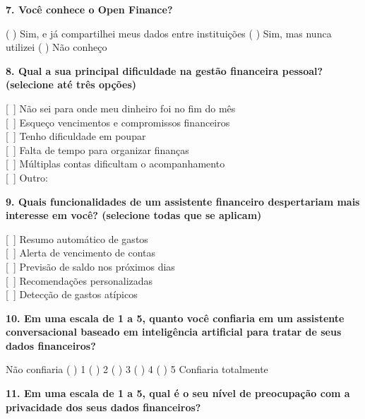 \textbf{7. Você conhece o Open Finance?}

\vspace{4pt}
( ) Sim, e já compartilhei meus dados entre instituições \quad ( ) Sim, mas nunca utilizei \quad ( ) Não conheço

\vspace{10pt}

\textbf{8. Qual a sua principal dificuldade na gestão financeira pessoal? (selecione até três opções)}

\vspace{4pt}
{[~]} Não sei para onde meu dinheiro foi no fim do mês\\
{[~]} Esqueço vencimentos e compromissos financeiros\\
{[~]} Tenho dificuldade em poupar\\
{[~]} Falta de tempo para organizar finanças\\
{[~]} Múltiplas contas dificultam o acompanhamento\\
{[~]} Outro: \underline{\hspace{5cm}}

\vspace{10pt}

\textbf{9. Quais funcionalidades de um assistente financeiro despertariam mais interesse em você? (selecione todas que se aplicam)}

\vspace{4pt}
{[~]} Resumo automático de gastos\\
{[~]} Alerta de vencimento de contas\\
{[~]} Previsão de saldo nos próximos dias\\
{[~]} Recomendações personalizadas\\
{[~]} Detecção de gastos atípicos

\vspace{10pt}

\newpage

\textbf{10. Em uma escala de 1 a 5, quanto você confiaria em um assistente conversacional baseado em inteligência artificial para tratar de seus dados financeiros?}

\vspace{4pt}
Não confiaria \quad ( ) 1 \quad ( ) 2 \quad ( ) 3 \quad ( ) 4 \quad ( ) 5 \quad Confiaria totalmente

\vspace{10pt}

\textbf{11. Em uma escala de 1 a 5, qual é o seu nível de preocupação com a privacidade dos seus dados financeiros?}

